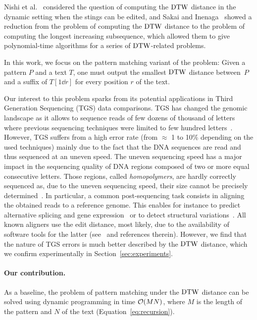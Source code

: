 Nishi et al.~\cite{DBLP:conf/spire/NishiNIBT20} considered the question of computing the $\mathrm{DTW}$ distance in the dynamic setting when the stings can be edited, and Sakai and Inenaga~\cite{DBLP:conf/isaac/SakaiI20} showed a reduction from the problem of computing the $\mathrm{DTW}$ distance to the problem of computing the longest increasing subsequence, which allowed them to give polynomial-time algorithms for a series of $\mathrm{DTW}$-related problems. 

In this work, we focus on the pattern matching variant of the problem: Given a pattern $P$ and a text $T$, one must output the smallest $\mathrm{DTW}$ distance between~$P$ and a suffix of $T[1 \dd r]$ for every position $r$ of the text. 

Our interest to this problem sparks from its potential applications in Third Generation Sequencing (TGS) data comparisons. TGS has changed the genomic landscape as it allows to sequence reads of few dozens of thousand of letters where previous sequencing techniques were limited to few hundred letters~\cite{amarasinghe2020opportunities}. However, TGS suffers from a high error rate (from $\approx$ 1 to 10\% depending on the used techniques) mainly due to the fact that the DNA sequences are read and thus sequenced at an uneven speed. The uneven sequencing speed has a major impact in the sequencing quality of DNA regions composed of two or more equal consecutive letters. Those regions, called \emph{homopolymers}, are hardly correctly sequenced as, due to the uneven sequencing speed, their size cannot be precisely determined~\cite{huang_homopolish_2021}. In particular, a common post-sequencing task  consists in aligning the obtained reads to a reference genome. This enables for instance to predict alternative splicing and gene expression~\cite{gonzalez2016introduction} or to detect structural variations~\cite{mahmoud2019structural}. All known aligners use the edit distance, most likely, due to the availability of software tools for the latter (see~\cite{10.1093/bioinformatics/bty191} and references therein). However, we find that the nature of TGS errors is much better described by the $\mathrm{DTW}$ distance, which we confirm experimentally in Section~\ref{sec:experiments}.

\paragraph{Our contribution.}  As a baseline, the problem of pattern matching under the $\mathrm{DTW}$ distance can be solved using dynamic programming in time $\mathcal{O}(MN)$, where $M$ is the length of the pattern and $N$ of the text (Equation~\ref{eq:recursion}). 

